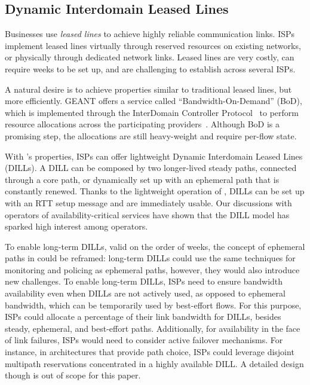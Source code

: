 \subsection{Dynamic Interdomain Leased Lines}

\noindent Businesses use \emph{leased lines} to achieve highly reliable
communication links. ISPs implement leased lines virtually through reserved
resources on existing networks, or physically through dedicated network links.
Leased lines are very costly, can require weeks to be set up, and are
challenging to establish across several ISPs.

A natural desire is to achieve properties similar to traditional leased lines,
but more efficiently. GEANT offers a service called ``Bandwidth-On-Demand''
(BoD), which is implemented through the InterDomain Controller
Protocol~\cite{idcp} to perform resource allocations across the participating
providers~\cite{geant:bod}.  Although BoD is a promising step, the allocations
are still heavy-weight and require per-flow state.

With \name's properties, ISPs can offer light\-weight Dynamic Interdomain
Leased Lines (DILLs). A DILL can be composed by two longer-lived steady paths,
connected through a core path, or dynamically set up with an ephemeral path
that is constantly renewed. Thanks to the light\-weight operation of \name,
DILLs can be set up with an RTT setup message and are immediately usable. Our
discussions with operators of availability-critical services have shown that
the DILL model has sparked high interest among operators.

To enable long-term DILLs, valid on the order of weeks, the concept of
ephemeral paths in \name could be reframed: long-term DILLs could use the same
techniques for monitoring and policing as ephemeral paths, however, they would
also introduce new challenges.  To enable long-term DILLs, ISPs need to ensure
bandwidth availability even when DILLs are not actively used, as opposed to
ephemeral bandwidth, which can be temporarily used by best-effort flows.  For
this purpose, ISPs could allocate a percentage of their link bandwidth for
DILLs, besides steady, ephemeral, and best-effort paths. Additionally, for
availability in the face of link failures, ISPs would need to consider active
failover mechanisms. For instance, in architectures that provide path choice,
ISPs could leverage disjoint multipath reservations concentrated in a highly
available DILL.  A detailed design though is out of scope for this paper. 


